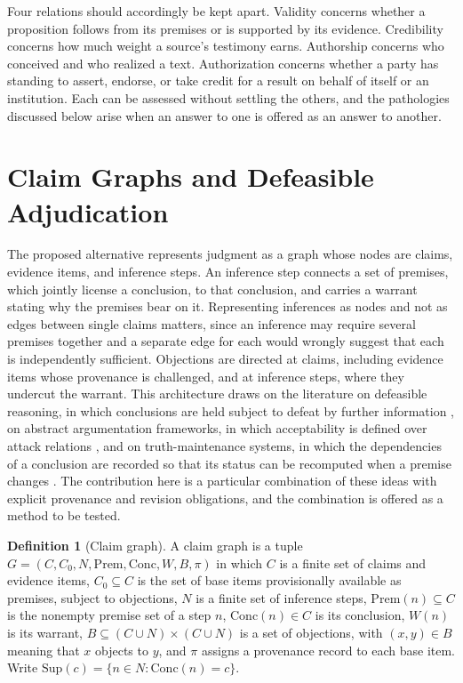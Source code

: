 \documentclass[12pt]{article}
\theoremstyle{definition}
\newtheorem{definition}{Definition}
\theoremstyle{remark}
\begin{document}
Four relations should accordingly be kept apart. Validity concerns whether a proposition follows from its premises or is supported by its evidence. Credibility concerns how much weight a source's testimony earns. Authorship concerns who conceived and who realized a text. Authorization concerns whether a party has standing to assert, endorse, or take credit for a result on behalf of itself or an institution. Each can be assessed without settling the others, and the pathologies discussed below arise when an answer to one is offered as an answer to another.

\section{Claim Graphs and Defeasible Adjudication}

The proposed alternative represents judgment as a graph whose nodes are claims, evidence items, and inference steps. An inference step connects a set of premises, which jointly license a conclusion, to that conclusion, and carries a warrant stating why the premises bear on it. Representing inferences as nodes and not as edges between single claims matters, since an inference may require several premises together and a separate edge for each would wrongly suggest that each is independently sufficient. Objections are directed at claims, including evidence items whose provenance is challenged, and at inference steps, where they undercut the warrant. This architecture draws on the literature on defeasible reasoning, in which conclusions are held subject to defeat by further information \cite{pollock1987}, on abstract argumentation frameworks, in which acceptability is defined over attack relations \cite{dung1995}, and on truth-maintenance systems, in which the dependencies of a conclusion are recorded so that its status can be recomputed when a premise changes \cite{doyle1979,dekleer1986}. The contribution here is a particular combination of these ideas with explicit provenance and revision obligations, and the combination is offered as a method to be tested.

\begin{definition}[Claim graph]
A claim graph is a tuple $G=(C,C_0,N,\mathrm{Prem},\mathrm{Conc},W,B,\pi)$ in which $C$ is a finite set of claims and evidence items, $C_0\subseteq C$ is the set of base items provisionally available as premises, subject to objections, $N$ is a finite set of inference steps, $\mathrm{Prem}(n)\subseteq C$ is the nonempty premise set of a step $n$, $\mathrm{Conc}(n)\in C$ is its conclusion, $W(n)$ is its warrant, $B\subseteq (C\cup N)\times(C\cup N)$ is a set of objections, with $(x,y)\in B$ meaning that $x$ objects to $y$, and $\pi$ assigns a provenance record to each base item. Write $\mathrm{Sup}(c)=\{n\in N:\mathrm{Conc}(n)=c\}$.
\end{definition}
\end{document}
